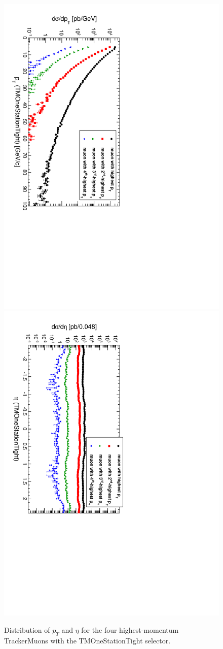 \documentclass[12pt]{article}
\begin{document}
\begin{figure}
\includegraphics[height=0.5\linewidth, angle=90]{fig/backgroundsMatching_plot/ptcurves_TMOneStationTight.pdf}
\includegraphics[height=0.5\linewidth, angle=90]{fig/backgroundsMatching_plot/etacurves_TMOneStationTight.pdf}

\caption{Distribution of $p_T$ and $\eta$ for the four highest-momentum TrackerMuons with the TMOneStationTight selector. \label{fig:curves_TMOneStationTight}}
\end{figure}
\end{document}
